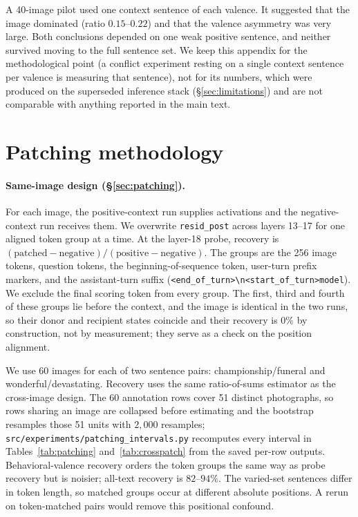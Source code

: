 \documentclass{article}
\begin{document}
A 40-image pilot used one context sentence of each valence. It suggested that the image dominated (ratio $0.15$--$0.22$) and that the valence asymmetry was very large. Both conclusions depended on one weak positive sentence, and neither survived moving to the full sentence set. We keep this appendix for the methodological point (a conflict experiment resting on a single context sentence per valence is measuring that sentence), not for its numbers, which were produced on the superseded inference stack (\S\ref{sec:limitations}) and are not comparable with anything reported in the main text.

\section{Patching methodology}
\label{app:patching}

\paragraph{Same-image design (\S\ref{sec:patching}).}
For each image, the positive-context run supplies activations and the negative-context run receives them. We overwrite \texttt{resid\_post} across layers 13--17 for one aligned token group at a time. At the layer-18 probe, recovery is $(\text{patched} - \text{negative})/(\text{positive} - \text{negative})$. The groups are the 256 image tokens, question tokens, the beginning-of-sequence token, user-turn prefix markers, and the assistant-turn suffix (\texttt{<end\_of\_turn>\textbackslash n<start\_of\_turn>model}). We exclude the final scoring token from every group. The first, third and fourth of these groups lie before the context, and the image is identical in the two runs, so their donor and recipient states coincide and their recovery is $0\%$ by construction, not by measurement; they serve as a check on the position alignment.

We use 60 images for each of two sentence pairs: championship/funeral and wonderful/devastating. Recovery uses the same ratio-of-sums estimator as the cross-image design. The 60 annotation rows cover 51 distinct photographs, so rows sharing an image are collapsed before estimating and the bootstrap resamples those 51 units with $2{,}000$ resamples; \texttt{src/experiments/patching\_intervals.py} recomputes every interval in Tables~\ref{tab:patching} and~\ref{tab:crosspatch} from the saved per-row outputs. Behavioral-valence recovery orders the token groups the same way as probe recovery but is noisier; all-text recovery is $82$--$94\%$. The varied-set sentences differ in token length, so matched groups occur at different absolute positions. A rerun on token-matched pairs would remove this positional confound.
\end{document}
